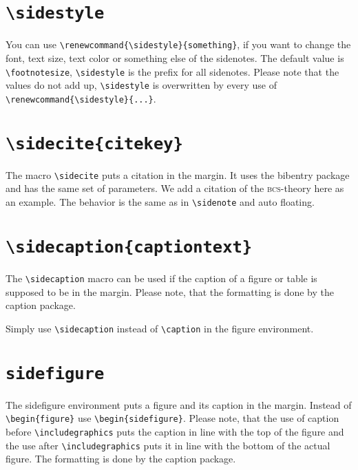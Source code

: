 \documentclass{book}
\begin{document}
\section{\texttt{\textbackslash sidestyle}}
\renewcommand{\sidestyle}{\raggedright\footnotesize}
You can use \verb+\renewcommand{\sidestyle}{something}+, if you want to change the font, text size, text color or something else of the sidenotes.
\renewcommand{\sidestyle}{\footnotesize\em}
The default value is \verb+\footnotesize+, \verb+\sidestyle+ is the prefix for all sidenotes. Please note that the values do not add up, \verb+\sidestyle+ is overwritten by every use of \verb+\renewcommand{\sidestyle}{...}+.%
\renewcommand{\sidestyle}{\footnotesize}%

\section{\texttt{\textbackslash sidecite\{citekey\}}}
The macro \verb+\sidecite+ puts a citation in the margin. It uses the bibentry package and has the same set of parameters. We add a citation of the \textsc{bcs}-theory here as an example. The behavior is the same as in \verb+\sidenote+ and auto floating. 

\section{\texttt{\textbackslash sidecaption\{captiontext\}}}
The \verb+\sidecaption+ macro can be used if the caption of a figure or table is supposed to be in the margin. Please note, that the formatting is done by the caption package. 
\begin{figure}[h]
\fbox{\rule{\textwidth}{0mm}\rule{0mm}{1.5cm}} %
\end{figure}
Simply use \verb+\sidecaption+ instead of \verb+\caption+ in the figure environment. 

\section{\texttt{sidefigure}}
The sidefigure environment puts a figure and its caption in the margin. Instead of \verb+\begin{figure}+ use \verb+\begin{sidefigure}+. Please note, that the use of caption before \verb+\includegraphics+ puts the caption in line with the top of the figure and the use after \verb+\includegraphics+ puts it in line with the bottom of the actual figure. The formatting is done by the caption package.
\begin{sidefigure}
\fbox{\rule{0mm}{1.2cm}\rule{\marginparwidth}{0mm}} %
\caption{This is a figure with its caption in the margin.}
\end{sidefigure}
\end{document}
